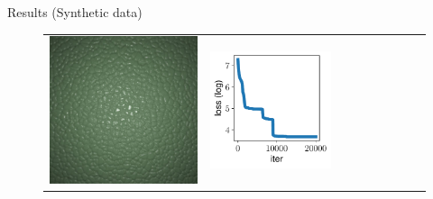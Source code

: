 \documentclass[final]{beamer}
\newlength{\twocolwid}
\newlength{\resultwidth}
\begin{document}
\begin{frame}[t]
\begin{columns}[t]
\begin{column}{\twocolwid}
\begin{block}{Results (Synthetic data)}
\begin{figure}[t]
\begin{tabular}{ccrclcccc}
            		\includegraphics[width=\resultwidth]{synth/leather/target.jpg} &
            		\includegraphics[width=\resultwidth]{synth/leather/loss.pdf} &

\end{tabular}
\end{figure}
\end{block}
\end{column}
\end{columns}
\end{frame}
\end{document}
